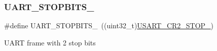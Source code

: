 \subsubsection{\texorpdfstring{U\+A\+R\+T\+\_\+\+S\+T\+O\+P\+B\+I\+T\+S\+\_}{UART\_STOPBITS\_2}}
{\footnotesize\ttfamily \#define U\+A\+R\+T\+\_\+\+S\+T\+O\+P\+B\+I\+T\+S\+\_~((uint32\+\_\+t)\hyperlink{group___peripheral___registers___bits___definition_ga2b24d14f0e5d1c76c878b08aad44d02b}{U\+S\+A\+R\+T\+\_\+\+C\+R2\+\_\+\+S\+T\+O\+P\+\_})}

U\+A\+RT frame with 2 stop bits 